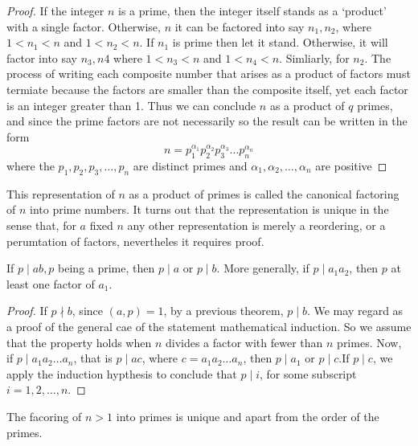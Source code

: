 \documentclass[11pt]{article}
\begin{document}
\begin{proof}
	If the integer \(n\) is a prime, then the integer itself stands as a `product' with a single factor. Otherwise, \(n\) it can be factored into say \(n_1, n_2\), where \(1 < n_1 < n\) and \( 1 < n_2 < n\). If \(n_1\) is prime then let it stand. Otherwise, it will factor into say \(n_3, n4\) where \(1 < n_3 < n\) and \(1 < n_4 < n\). Simliarly, for \(n_2\). The process of writing each composite number that arises as a product of factors must termiate because the factors are smaller than the composite itself, yet each factor is an integer greater than 1. Thus we can conclude \(n\) as a product of \(q\) primes, and since the prime factors are not necessarily so the result can be written in the form
	\[ n = p_1^{\alpha_1}p_2^{\alpha_2}p_3^{\alpha_3}\ldots p_n^{\alpha_n}\]
	where the \(p_1, p_2, p_3, \ldots, p_n\) are distinct primes and \(\alpha_1,
	\alpha_2, \ldots, \alpha_n\) are positive
\end{proof}
\begin{fact}
	This representation of \(n\) as a product of primes is called the canonical
	factoring of \(n\) into prime numbers. It turns out that the representation is
	unique in the sense that, for \(a\) fixed \(n\) any other representation is
	merely a reordering, or a perumtation of factors, nevertheles it requires
	proof.
\end{fact}

\begin{theorem}\label{1.15}
	If \(p \mid ab, p\) being a prime, then \(p \mid a\) or \(p \mid b\). More generally, if \(p \mid a_1 a_2\), then \(p\) at least one factor of \(a_1\).
\end{theorem}

\begin{proof}
	If \(p \nmid b\), since \((a, p) = 1\), by a previous theorem, \(p \mid b\). We may regard as a proof of the general cae of the statement mathematical induction. So we assume that the property holds when \(n\) divides a factor with fewer than \(n\) primes.
	Now, if \(p \mid a_1a_2\ldots a_n\), that is \(p \mid ac\), where \(c = a_1a_2\ldots a_n\), then \(p \mid a_1\) or \(p \mid c\).If \(p \mid c\), we apply the induction hypthesis to conclude that \(p \mid i\), for some subscript \(i = 1, 2, \ldots, n\).
\end{proof}

\begin{theorem}\label{1.16}
	The facoring of \(n > 1\) into primes is unique and apart from the order of the primes.
\end{theorem}
\end{document}
